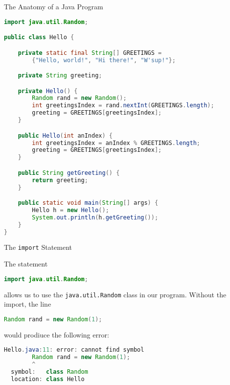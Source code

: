 \documentclass{beamer}
\author[Chris Simpkins]
{Christopher Simpkins \\\texttt{chris.simpkins@gatech.edu}}
\institute[Georgia Tech] %
\date[CS 1331]{}
\begin{document}
\begin{frame}
  \titlepage
\end{frame}


\begin{frame}[fragile]{The Anatomy of a Java Program}


\vspace{-.1in}
\begin{lstlisting}[language=Java,textsize=8pt]
import java.util.Random;

public class Hello {

    private static final String[] GREETINGS =
        {"Hello, world!", "Hi there!", "W'sup!"};

    private String greeting;

    private Hello() {
        Random rand = new Random();
        int greetingsIndex = rand.nextInt(GREETINGS.length);
        greeting = GREETINGS[greetingsIndex];
    }

    public Hello(int anIndex) {
        int greetingsIndex = anIndex % GREETINGS.length;
        greeting = GREETINGS[greetingsIndex];
    }

    public String getGreeting() {
        return greeting;
    }

    public static void main(String[] args) {
        Hello h = new Hello();
        System.out.println(h.getGreeting());
    }
}
\end{lstlisting}

\end{frame}

\begin{frame}[fragile]{The {\tt import} Statement}


The statement
\begin{lstlisting}[language=Java]
import java.util.Random;
\end{lstlisting}
allows us to use the {\tt java.util.Random} class in our program.  Without the import, the line
\begin{lstlisting}[language=Java]
  Random rand = new Random(1);
\end{lstlisting}
would prodiuce the following error:
\begin{lstlisting}[language=Java]
Hello.java:11: error: cannot find symbol
        Random rand = new Random(1);
        ^
  symbol:   class Random
  location: class Hello
\end{lstlisting}

\end{frame}
\end{document}
